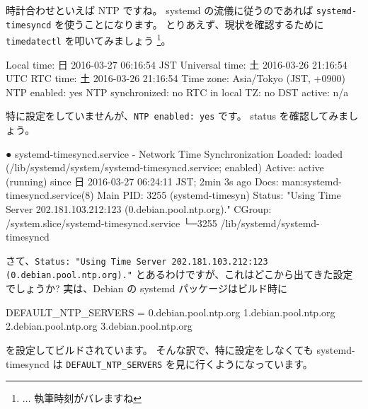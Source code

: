 \documentclass[mingoth,a4paper]{jsarticle}
\begin{document}
時計合わせといえば NTP ですね。
systemd の流儀に従うのであれば \verb|systemd-timesyncd| を使うことになります。
とりあえず、現状を確認するために \verb|timedatectl| を叩いてみましょう%
\footnote{$\dots$ 執筆時刻がバレますね}。
\begin{commandline}
      Local time: 日 2016-03-27 06:16:54 JST
  Universal time: 土 2016-03-26 21:16:54 UTC
        RTC time: 土 2016-03-26 21:16:54
       Time zone: Asia/Tokyo (JST, +0900)
     NTP enabled: yes
NTP synchronized: no
 RTC in local TZ: no
      DST active: n/a
\end{commandline}
\noindent
特に設定をしていませんが、\verb|NTP enabled: yes| です。
%
status を確認してみましょう。
\begin{commandline}
● systemd-timesyncd.service - Network Time Synchronization
   Loaded: loaded (/lib/systemd/system/systemd-timesyncd.service; enabled)
   Active: active (running) since 日 2016-03-27 06:24:11 JST; 2min 3s ago
     Docs: man:systemd-timesyncd.service(8)
 Main PID: 3255 (systemd-timesyn)
   Status: "Using Time Server 202.181.103.212:123 (0.debian.pool.ntp.org)."
   CGroup: /system.slice/systemd-timesyncd.service
           └─3255 /lib/systemd/systemd-timesyncd
\end{commandline}
\noindent
さて、\verb|Status: "Using Time Server 202.181.103.212:123 (0.debian.pool.ntp.org)."| とあるわけですが、これはどこから出てきた設定でしょうか?
%
実は、Debian の systemd パッケージはビルド時に
\begin{commandline}
  DEFAULT_NTP_SERVERS = 0.debian.pool.ntp.org 1.debian.pool.ntp.org 2.debian.pool.ntp.org 3.debian.pool.ntp.org
\end{commandline}
\noindent
を設定してビルドされています。
そんな訳で、特に設定をしなくても systemd-timesyncd は \verb|DEFAULT_NTP_SERVERS| を見に行くようになっています。
\end{document}
